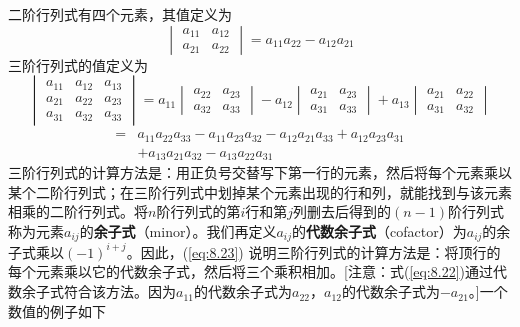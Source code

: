    二阶行列式有四个元素，其值定义为
    \begin{equation}
        \boxed{
            \begin{vmatrix}
                a_{11} & a_{12} \\
                a_{21} & a_{22}
            \end{vmatrix} = a_{11}a_{22} - a_{12}a_{21}
        }
        \label{eq:8.22}
    \end{equation}
    三阶行列式的值定义为
    \begin{equation}
            \boxed{
            \begin{vmatrix}
                a_{11} & a_{12} & a_{13} \\
                a_{21} & a_{22} & a_{23} \\
                a_{31} & a_{32} & a_{33}
            \end{vmatrix} = a_{11}\begin{vmatrix}
                a_{22} & a_{23} \\
                a_{32} & a_{33}
            \end{vmatrix} - a_{12}\begin{vmatrix}
                a_{21} & a_{23} \\
                a_{31} & a_{33}
            \end{vmatrix} + a_{13}\begin{vmatrix}
                a_{21} & a_{22} \\
                a_{31} & a_{32}
            \end{vmatrix}
        }
        \label{eq:8.23}
    \end{equation}
    \begin{equation}
        \begin{aligned}
            = & a_{11}a_{22}a_{33} - a_{11}a_{23}a_{32} - a_{12}a_{21}a_{33} + a_{12}a_{23}a_{31} \\ 
            & + a_{13}a_{21}a_{32} - a_{13}a_{22}a_{31}
        \end{aligned}
        \label{eq:8.24}
    \end{equation}
    三阶行列式的计算方法是：用正负号交替写下第一行的元素，然后将每个元素乘以某个二阶行列式；在三阶行列式中划掉某个元素出现的行和列，就能找到与该元素相乘的二阶行列式。将$n$阶行列式的第$i$行和第$j$列删去后得到的$\left(n-1\right)$阶行列式称为元素$a_{ij}$的\textbf{余子式}（minor）。我们再定义$a_{ij}$的\textbf{代数余子式}（cofactor）为$a_{ij}$的余子式乘以$(-1)^{i+j}$。因此，(\ref{eq:8.23}) 说明三阶行列式的计算方法是：将顶行的每个元素乘以它的代数余子式，然后将三个乘积相加。[注意：式(\ref{eq:8.22})通过代数余子式符合该方法。因为$a_{11}$的代数余子式为$a_{22}$，$a_{12}$的代数余子式为$-a_{21}$。]一个数值的例子如下
